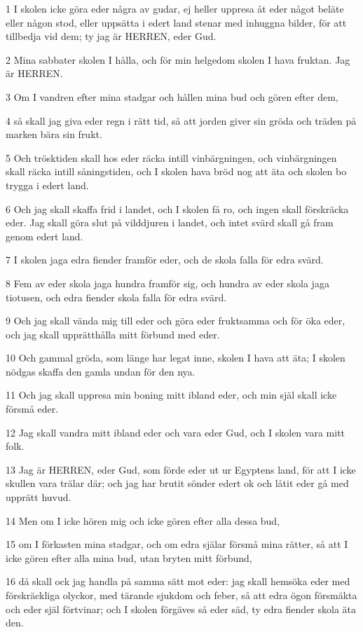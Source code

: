 \par 1 I skolen icke göra eder några av gudar, ej heller uppresa åt eder något beläte eller någon stod, eller uppsätta i edert land stenar med inhuggna bilder, för att tillbedja vid dem; ty jag är HERREN, eder Gud.
\par 2 Mina sabbater skolen I hålla, och för min helgedom skolen I hava fruktan. Jag är HERREN.
\par 3 Om I vandren efter mina stadgar och hållen mina bud och gören efter dem,
\par 4 så skall jag giva eder regn i rätt tid, så att jorden giver sin gröda och träden på marken bära sin frukt.
\par 5 Och trösktiden skall hos eder räcka intill vinbärgningen, och vinbärgningen skall räcka intill såningstiden, och I skolen hava bröd nog att äta och skolen bo trygga i edert land.
\par 6 Och jag skall skaffa frid i landet, och I skolen få ro, och ingen skall förskräcka eder. Jag skall göra slut på vilddjuren i landet, och intet svärd skall gå fram genom edert land.
\par 7 I skolen jaga edra fiender framför eder, och de skola falla för edra svärd.
\par 8 Fem av eder skola jaga hundra framför sig, och hundra av eder skola jaga tiotusen, och edra fiender skola falla för edra svärd.
\par 9 Och jag skall vända mig till eder och göra eder fruktsamma och för öka eder, och jag skall upprätthålla mitt förbund med eder.
\par 10 Och gammal gröda, som länge har legat inne, skolen I hava att äta; I skolen nödgas skaffa den gamla undan för den nya.
\par 11 Och jag skall uppresa min boning mitt ibland eder, och min själ skall icke försmå eder.
\par 12 Jag skall vandra mitt ibland eder och vara eder Gud, och I skolen vara mitt folk.
\par 13 Jag är HERREN, eder Gud, som förde eder ut ur Egyptens land, för att I icke skullen vara trälar där; och jag har brutit sönder edert ok och låtit eder gå med upprätt huvud.
\par 14 Men om I icke hören mig och icke gören efter alla dessa bud,
\par 15 om I förkasten mina stadgar, och om edra själar försmå mina rätter, så att I icke gören efter alla mina bud, utan bryten mitt förbund,
\par 16 då skall ock jag handla på samma sätt mot eder: jag skall hemsöka eder med förskräckliga olyckor, med tärande sjukdom och feber, så att edra ögon försmäkta och eder själ förtvinar; och I skolen förgäves så eder säd, ty edra fiender skola äta den.
